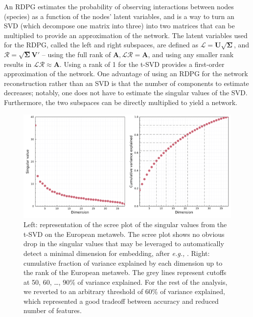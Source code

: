 An RDPG estimates the probability of observing interactions between
nodes (species) as a function of the nodes' latent variables, and is a
way to turn an SVD (which decompose one matrix into three) into two
matrices that can be multiplied to provide an approximation of the
network. The latent variables used for the RDPG, called the left and
right subspaces, are defined as
$\mathscr{L} = \mathbf{U}\sqrt{\mathbf{\Sigma}}$, and
$\mathscr{R} = \sqrt{\mathbf{\Sigma}}\mathbf{V}'$ -- using the full
rank of $\mathbf{A}, \mathscr{L}\mathscr{R} = \mathbf{A}$, and
using any smaller rank results in
$\mathscr{L}\mathscr{R} \approx \mathbf{A}$. Using a rank of 1 for the
t-SVD provides a first-order approximation of the network. One advantage
of using an RDPG for the network reconstruction rather than an SVD is
that the number of components to estimate decreases; notably, one does
not have to estimate the singular values of the SVD. Furthermore, the
two subspaces can be directly multiplied to yield a network.

\begin{figure}[h]
    \centering
    \includegraphics[width=\textwidth]{figures/figure-screeplot.png}
    \caption{Left: representation of the scree plot of the singular values
from the t-SVD on the European metaweb. The scree plot shows no obvious
drop in the singular values that may be leveraged to automatically
detect a minimal dimension for embedding, after \emph{e.g.,}
\cite{Zhu2006AutDim}. Right: cumulative fraction of variance explained by each
dimension up to the rank of the European metaweb. The grey lines
represent cutoffs at 50, 60, \ldots, 90\% of variance explained. For the
rest of the analysis, we reverted to an arbitrary threshold of 60\% of
variance explained, which represented a good tradeoff between accuracy
and reduced number of features.}
    \label{fig:scree}
\end{figure}

